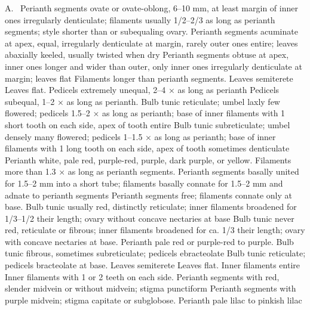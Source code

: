 \documentclass{ctexart}
\begin{document}
\begin{Key*}{A.~}
\alter Perianth segments ovate or ovate-oblong, 6--10 mm, at least margin of inner ones irregularly denticulate; filaments usually 1/2--2/3 as long as perianth segments; style shorter than or subequaling ovary.
\alter Perianth segments acuminate at apex, equal, irregularly denticulate at margin, rarely outer ones entire; leaves abaxially keeled, usually twisted when dry
\alter Perianth segments obtuse at apex, inner ones longer and wider than outer, only inner ones irregularly denticulate at margin; leaves flat
\alter Filaments longer than perianth segments.
\alter Leaves semiterete
\alter Leaves flat.
\alter Pedicels extremely unequal, 2--4 × as long as perianth
\alter Pedicels subequal, 1--2 × as long as perianth.
\alter Bulb tunic reticulate; umbel laxly few flowered; pedicels 1.5--2 × as long as perianth; base of inner filaments with 1 short tooth on each side, apex of tooth entire
\alter Bulb tunic subreticulate; umbel densely many flowered; pedicels 1--1.5 × as long as perianth; base of inner filaments with 1 long tooth on each side, apex of tooth sometimes denticulate
\alter Perianth white, pale red, purple-red, purple, dark purple, or yellow.
\alter Filaments more than 1.3 × as long as perianth segments.
\alter Perianth segments basally united for 1.5--2 mm into a short tube; filaments basally connate for 1.5--2 mm and adnate to perianth segments
\alter Perianth segments free; filaments connate only at base.
\alter Bulb tunic usually red, distinctly reticulate; inner filaments broadened for 1/3--1/2 their length; ovary without concave nectaries at base
\alter Bulb tunic never red, reticulate or fibrous; inner filaments broadened for ca. 1/3 their length; ovary with concave nectaries at base.
\alter Perianth pale red or purple-red to purple.
\alter Bulb tunic fibrous, sometimes subreticulate; pedicels ebracteolate
\alter Bulb tunic reticulate; pedicels bracteolate at base.
\alter Leaves semiterete
\alter Leaves flat.
\alter Inner filaments entire
\alter Inner filaments with 1 or 2 teeth on each side.
\alter Perianth segments with red, slender midvein or without midvein; stigma punctiform
\alter Perianth segments with purple midvein; stigma capitate or subglobose.
\alter Perianth pale lilac to pinkish lilac

\end{Key*}
\end{document}
